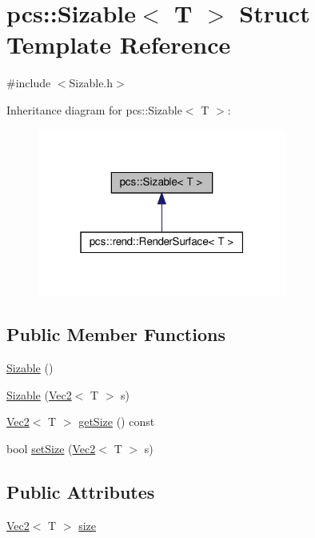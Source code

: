 \hypertarget{structpcs_1_1Sizable}{}\section{pcs\+:\+:Sizable$<$ T $>$ Struct Template Reference}
\label{structpcs_1_1Sizable}


{\ttfamily \#include $<$Sizable.\+h$>$}



Inheritance diagram for pcs\+:\+:Sizable$<$ T $>$\+:\nopagebreak
\begin{figure}[H]
\begin{center}
\leavevmode
\includegraphics[width=232pt]{structpcs_1_1Sizable__inherit__graph}
\end{center}
\end{figure}
\subsection*{Public Member Functions}
\begin{DoxyCompactItemize}
\item 
\hyperlink{structpcs_1_1Sizable_a3d9a35994cf6cca4780b71696f272478}{Sizable} ()
\item 
\hyperlink{structpcs_1_1Sizable_a055bb2c5e72647cbbd08ff4499220b1f}{Sizable} (\hyperlink{structpcs_1_1Vec2}{Vec2}$<$ T $>$ s)
\item 
\hyperlink{structpcs_1_1Vec2}{Vec2}$<$ T $>$ \hyperlink{structpcs_1_1Sizable_a25a557b9cef6256101642913866c1a3f}{get\+Size} () const
\item 
bool \hyperlink{structpcs_1_1Sizable_a356e9bf805e68bfff1990ee324088d65}{set\+Size} (\hyperlink{structpcs_1_1Vec2}{Vec2}$<$ T $>$ s)
\end{DoxyCompactItemize}
\subsection*{Public Attributes}
\begin{DoxyCompactItemize}
\item 
\hyperlink{structpcs_1_1Vec2}{Vec2}$<$ T $>$ \hyperlink{structpcs_1_1Sizable_a52fe8b008a1fe91dd9a0766055d433a3}{size}
\end{DoxyCompactItemize}


